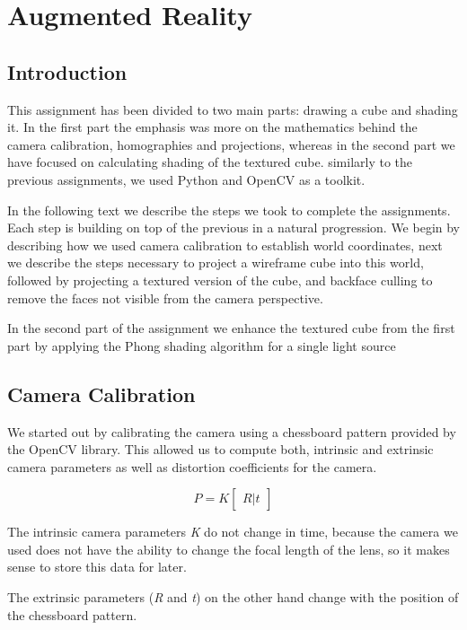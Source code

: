 \pagebreak
\section{Augmented Reality}

\subsection{Introduction}

This assignment has been divided to two main parts: drawing a cube and shading it. In the first part the emphasis was more on the mathematics behind the camera calibration, homographies and projections, whereas in the second part we have focused on calculating shading of the textured cube. similarly to the previous assignments, we used Python and OpenCV as a toolkit.

In the following text we describe the steps we took to complete the assignments. Each step is building on top of  the previous in a natural progression. We begin by describing how we used camera calibration to establish world coordinates, next we describe the steps necessary to project a wireframe cube into this world, followed by projecting a textured version of the cube, and backface culling to remove the faces not visible from the camera perspective.

In the second part of the assignment we enhance the textured cube from the first part by applying the Phong shading algorithm for a single light source


\subsection{Camera Calibration}
We started out by calibrating the camera using a chessboard pattern provided by the OpenCV library. This allowed us to compute both, intrinsic and extrinsic camera parameters as well as distortion coefficients for the camera. 

\begin{equation}
	P = K \begin{bmatrix} R|t \end{bmatrix}
\end{equation}

The intrinsic camera parameters \textit{K} do not change in time, because the camera we used does not have the ability to change the focal length of the lens, so it makes sense to store this data for later. 

The extrinsic parameters (\textit{R} and \textit{t}) on the other hand change with the position of the chessboard pattern.

